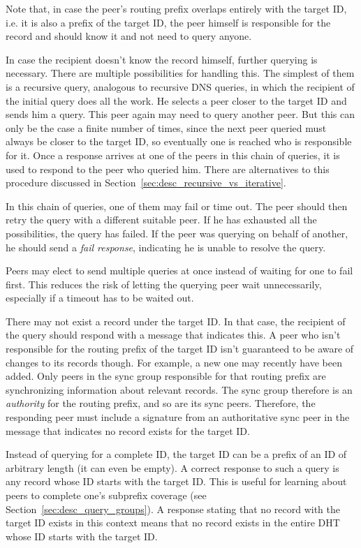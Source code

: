 Note that, in case the peer's routing prefix overlaps entirely with the target
ID, i.e. it is also a prefix of the target ID, the peer himself is responsible
for the record and should know it and not need to query anyone.

In case the recipient doesn't know the record himself, further querying is
necessary. There are multiple possibilities for handling this. The simplest of
them is a recursive query, analogous to recursive DNS queries, in which the
recipient of the initial query does all the work. He selects a peer closer to
the target ID and sends him a query. This peer again may need to query another
peer. But this can only be the case a finite number of times, since the next
peer queried must always be closer to the target ID, so eventually one is
reached who is responsible for it. Once a response arrives at one of the peers
in this chain of queries, it is used to respond to the peer who queried him.
There are alternatives to this procedure discussed in
Section~\ref{sec:desc_recursive_vs_iterative}.

In this chain of queries, one of them may fail or time out. The peer should then
retry the query with a different suitable peer. If he has exhausted all the
possibilities, the query has failed. If the peer was querying on behalf of
another, he should send a \emph{fail response}, indicating he is unable to
resolve the query.

Peers may elect to send multiple queries at once instead of waiting for one to
fail first. This reduces the risk of letting the querying peer wait
unnecessarily, especially if a timeout has to be waited out.

There may not exist a record under the target ID. In that case, the recipient of
the query should respond with a message that indicates this. A peer who isn't
responsible for the routing prefix of the target ID isn't guaranteed to be aware
of changes to its records though. For example, a new one may recently have been
added. Only peers in the sync group responsible for that routing prefix are
synchronizing information about relevant records. The sync group therefore is an
\emph{authority} for the routing prefix, and so are its sync peers. Therefore,
the responding peer must include a signature from an authoritative sync peer in
the message that indicates no record exists for the target ID.

Instead of querying for a complete ID, the target ID can be a prefix of an ID of
arbitrary length (it can even be empty). A correct response to such a query is
any record whose ID starts with the target ID. This is useful for learning about
peers to complete one's subprefix coverage (see
Section~\ref{sec:desc_query_groups}). A response stating that no record with the
target ID exists in this context means that no record exists in the entire
\ac{DHT} whose ID starts with the target ID.


